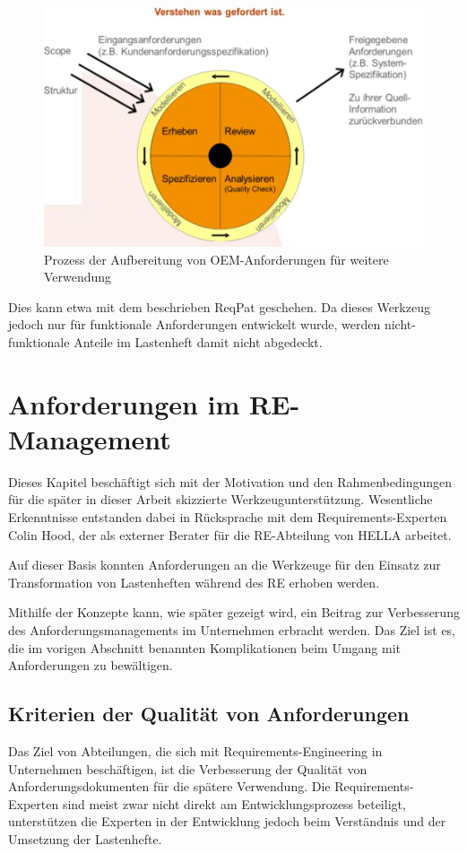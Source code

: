 \documentclass[12pt]{report}
\begin{document}
\begin{figure}[h!]
\begin{center}
\includegraphics[scale=0.6]{Bilder/HOOD-Definition.jpg}
\caption{Prozess der Aufbereitung von OEM-Anforderungen für weitere Verwendung \cite{hp12}}
\end{center}
\end{figure}

Dies kann etwa mit dem beschrieben ReqPat geschehen. Da dieses Werkzeug jedoch nur für funktionale Anforderungen entwickelt wurde, werden nicht-funktionale Anteile im Lastenheft damit nicht abgedeckt. 

\section[Anforderungen im RE]{Anforderungen im RE-Management}
Dieses Kapitel beschäftigt sich mit der Motivation und den Rahmenbedingungen für die später in dieser Arbeit skizzierte Werkzeugunterstützung. Wesentliche Erkenntnisse entstanden dabei in Rücksprache mit dem Requirements-Experten Colin Hood, der als externer Berater für die RE-Abteilung von HELLA arbeitet. 

Auf dieser Basis konnten Anforderungen an die Werkzeuge für den Einsatz zur Transformation von Lastenheften während des RE erhoben werden. 

Mithilfe der Konzepte kann, wie später gezeigt wird, ein Beitrag zur Verbesserung des Anforderungsmanagements im Unternehmen erbracht werden. Das Ziel ist es, die im vorigen Abschnitt benannten Komplikationen beim Umgang mit Anforderungen zu bewältigen.

\subsection{Kriterien der Qualität von Anforderungen}
Das Ziel von Abteilungen, die sich mit Requirements-Engineering in Unternehmen beschäftigen, ist die Verbesserung der Qualität von Anforderungsdokumenten für die spätere Verwendung. Die Requirements-Experten sind meist zwar nicht direkt am Entwicklungsprozess beteiligt, unterstützen die Experten in der Entwicklung jedoch beim Verständnis und der Umsetzung der Lastenhefte.
\end{document}
